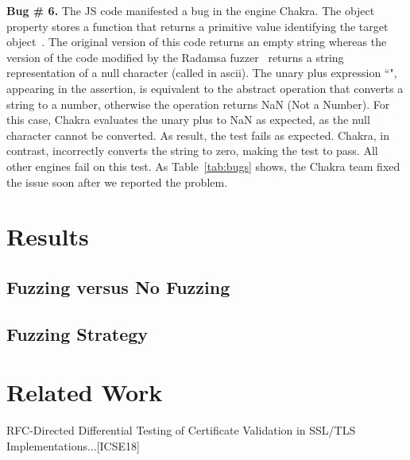 \documentclass[10pt,conference,anonymous]{IEEEtran}
\begin{document}
 

\vspace{1ex}\noindent\textbf{Bug \# 6.} The JS code  
manifested a bug in the \js{} engine Chakra.  The object
property  stores a function that returns a primitive
value identifying the target object~\cite{valueof}. The original
version of this code returns an empty string whereas the version of
the code modified by the Radamsa fuzzer~\cite{radamsa} returns a string
representation of a null character (called  in ascii). The
unary plus expression ``", appearing in the assertion, is
equivalent to the abstract operation 
that converts a string to a number, otherwise the operation returns
NaN (Not a Number)\cite{unary-plus}. For this case, Chakra evaluates
the unary plus to NaN as expected, as the null character cannot be
converted. As result, the test fails as expected. Chakra, in contrast,
incorrectly converts the string to zero, making the test to pass. All
other engines fail on this test. As Table~\ref{tab:bugs} shows, the
Chakra team fixed the issue soon after we reported the problem.

\section{Results}

\subsection{Fuzzing versus No Fuzzing}

\subsection{Fuzzing Strategy}

\section{Related Work}

RFC-Directed Differential Testing of Certificate Validation in SSL/TLS Implementations...[ICSE18]


%


\end{document}
